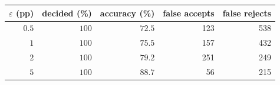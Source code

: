 \begin{tabular}{rrrrr}
\toprule
$\varepsilon$ (pp) & decided (\%) & accuracy (\%) & false accepts & false rejects \\
\midrule
$0.5$ & $100$ & $72.5$ & 123 & 538 \\
$1$ & $100$ & $75.5$ & 157 & 432 \\
$2$ & $100$ & $79.2$ & 251 & 249 \\
$5$ & $100$ & $88.7$ & 56 & 215 \\
\bottomrule
\end{tabular}
